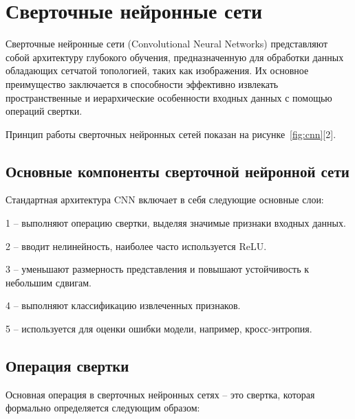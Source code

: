 \section{Сверточные нейронные сети}
\hspace*{12.5 mm}
Сверточные нейронные сети (Convolutional Neural Networks) представляют собой 
архитектуру глубокого обучения, предназначенную для обработки данных обладающих 
сетчатой топологией, таких как изображения. Их основное преимущество 
заключается в способности эффективно извлекать пространственные и иерархические 
особенности входных данных с помощью операций свертки.

Принцип работы сверточных нейронных сетей показан на рисунке~\ref{fig:cnn}[2].


\subsection{Основные компоненты сверточной нейронной сети}
\hspace*{12.5 mm}Стандартная архитектура CNN включает в себя следующие основные 
слои:

    1  – выполняют операцию свертки, выделяя значимые 
признаки входных данных.

    2  – вводит нелинейность, наиболее часто 
используется ReLU.\@

    3  – уменьшают размерность представления и 
повышают устойчивость к небольшим сдвигам.

    4  – выполняют классификацию извлеченных признаков.

    5  – используется для оценки ошибки модели, например, 
кросс-энтропия.

\subsection{Операция свертки}
\hspace*{12.5 mm}Основная операция в сверточных нейронных сетях – это свертка, 
которая формально определяется следующим образом:

